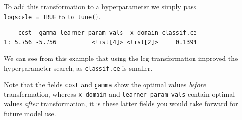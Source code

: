 To add this transformation to a hyperparameter we simply pass
\texttt{logscale\ =\ TRUE} to
\href{https://paradox.mlr-org.com/reference/to_tune.html}{\texttt{to\_tune()}}.

\begin{Shaded}
\begin{Highlighting}[]
\OtherTok{=} \NormalTok{(}\NormalTok{,}
   \NormalTok{(}\NormalTok{, }\NormalTok{, } \NormalTok{),}
   \NormalTok{(}\NormalTok{, }\NormalTok{, } \NormalTok{),}
   \NormalTok{,}
   
\NormalTok{)}

\OtherTok{=} \NormalTok{(}
   \NormalTok{(}\NormalTok{, } \NormalTok{),}
   \NormalTok{(}\NormalTok{),}
   \NormalTok{(}\NormalTok{)}
\NormalTok{)}

\SpecialCharTok{$}
\end{Highlighting}
\end{Shaded}

\begin{verbatim}
    cost  gamma learner_param_vals  x_domain classif.ce
1: 5.756 -5.756          <list[4]> <list[2]>     0.1394
\end{verbatim}

We can see from this example that using the log transformation improved
the hyperparameter search, as \texttt{classif.ce} is smaller.

Note that the fields \texttt{cost} and \texttt{gamma} show the optimal
values \emph{before} transformation, whereas \texttt{x\_domain} and
\texttt{learner\_param\_vals} contain optimal values \emph{after}
transformation, it is these latter fields you would take forward for
future model use.

\begin{Shaded}
\begin{Highlighting}[]
\SpecialCharTok{$}\SpecialCharTok{$}
\end{Highlighting}
\end{Shaded}

